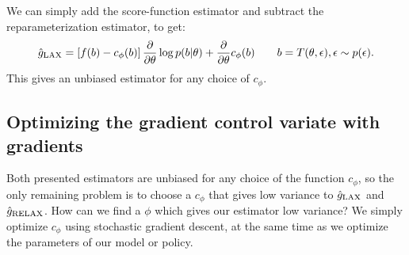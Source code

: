 \documentclass{article}
\newcommand{\E}{\mathbb{E}}
\newcommand{\PT}{\frac{\partial}{\partial \theta}}
\newcommand{\LP}[1]{\PT \log p(#1)}
\newcommand{\YW}[1]{{\color{red} \bf [[YW: #1]]}}
\newcommand{\LAX}{{\textnormal{LAX}}}
\newcommand{\RELAX}{{\textnormal{RELAX}}}
\begin{document}
%
%
%
%
We can simply add the score-function estimator and subtract the reparameterization estimator, to get:
%
\begin{align}
\label{eq:cont_est}
\hat g_\LAX = \left[ f(b) -c_\phi(b) \right] \PT \log p(b|\theta) + \PT c_\phi(b) \qquad b = T(\theta, \epsilon), \epsilon \sim p(\epsilon).
\end{align}
%
This gives an unbiased estimator for any choice of $c_\phi$.

\subsection{Optimizing the gradient control variate with gradients}

Both presented estimators are unbiased for any choice of the function $c_\phi$, so the only remaining problem is to choose a $c_\phi$ that gives low variance to $\hat g_\LAX$ and $\hat g_\RELAX{}$.
How can we find a $\phi$ which gives our estimator low variance?
We simply optimize $c_\phi$ using stochastic gradient descent, at the same time as we optimize the parameters of our model or policy.
\end{document}
